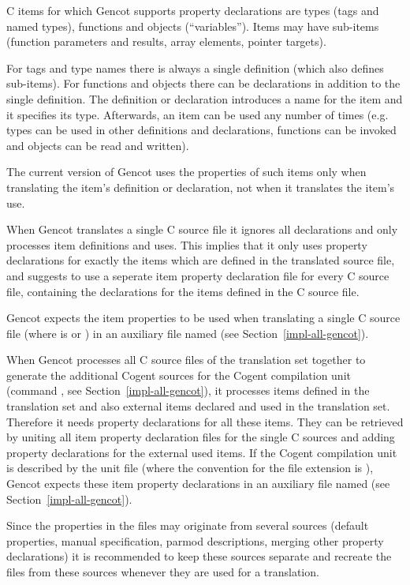 C items for which Gencot supports property declarations are types (tags and named types), functions and objects (``variables'').
Items may have sub-items (function parameters and results, array elements, pointer targets). 

For tags and type names there is always a single definition (which also defines sub-items). For functions and objects there 
can be declarations
in addition to the single definition. The definition or declaration introduces a name for the item and it specifies its type.
Afterwards, an item can be used any number of times (e.g. types can be used in other definitions and declarations, functions
can be invoked and objects can be read and written).

The current version of Gencot uses the properties of such items only when translating the item's definition or declaration, not when 
it translates the item's use. 

When Gencot translates a single C source file it ignores all declarations and only processes item definitions and uses. This implies
that it only uses property declarations for exactly the items which are defined in the translated source file, and suggests to
use a seperate item property declaration file for every C source file, containing the declarations for the items defined in the 
C source file.

Gencot expects the item properties to be used when translating a single C source file  (where  
is  or ) in an auxiliary file named  (see Section~\ref{impl-all-gencot}).

When Gencot processes all C source files of the translation set together to generate the additional Cogent sources for the
Cogent compilation unit (command , see Section~\ref{impl-all-gencot}), it processes items defined in the
translation set and also external items declared and used in the translation set. Therefore it needs property declarations 
for all these items. They can be retrieved by uniting all item property declaration files for the single C sources and adding
property declarations for the external used items. If the Cogent compilation unit is described by the unit file  
(where the convention for the file extension  is ), Gencot expects these item property declarations
in an auxiliary file named  (see Section~\ref{impl-all-gencot}).

Since the properties in the  files may originate from several sources (default properties, manual specification, 
parmod descriptions, merging other property declarations) it is recommended to keep these sources separate and recreate
the  files from these sources whenever they are used for a translation. 

